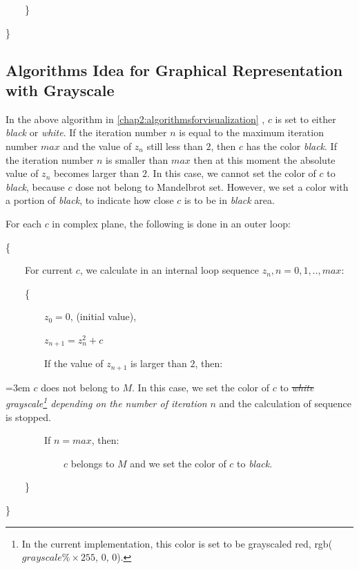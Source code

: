 ~~~~\}

\}

\subsection*{Algorithms Idea for Graphical Representation with Grayscale}

In the above algorithm in \ref{chap2:algorithmsforvisualization} , $c$ is set to either \emph{black} or \emph{white}. If the iteration number $n$ is equal to the maximum iteration number $max$ and the value of $z_n$ still less than $2$, then $c$ has the color \emph{black}. If the iteration number $n$ is smaller than $max$ then at this moment the absolute value of $z_n$ becomes larger than $2$. In this case, we cannot set the color of $c$ to \emph{black}, because $c$ dose not belong to Mandelbrot set. However, we set a color with a portion of \emph{black}, to indicate how close $c$ is to be in \emph{black} area.

For each $c$ in complex plane, the following is done in an outer loop:

\{

~~~~For current $c$, we calculate in an internal loop sequence $z_n, n = 0, 1, .., max$:

~~~~\{

~~~~~~~~$z_0 = 0$, (initial value),

~~~~~~~~$z_{n+1} = z_n^2 + c$

~~~~~~~~If the value of $z_{n+1}$ is larger than $2$, then:

\begingroup
    \leftskip=3em $c$ does not belong to $M$. In this case, we set the color of $c$ to \st{\emph{white}} \emph{grayscale\footnote{ In the current implementation, this color is set to be grayscaled red, rgb($grayscale\% \times 255$, 0, 0).} depending on the number of iteration} $n$ and the calculation of sequence is stopped.\par
\endgroup

~~~~~~~~If $n = max$, then:

~~~~~~~~~~~~$c$ belongs to $M$ and we set the color of $c$ to \emph{black}.

~~~~\}

\}